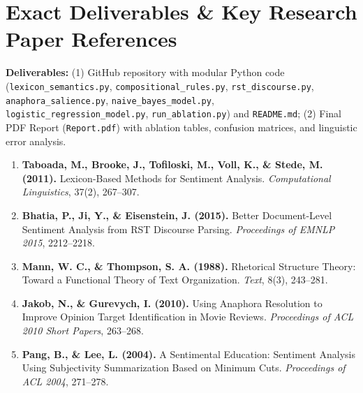 \documentclass[11pt,a4paper]{article}
\begin{document}
\section{Exact Deliverables \& Key Research Paper References}
\textbf{Deliverables:} (1) GitHub repository with modular Python code (\texttt{lexicon\_semantics.py}, \texttt{compositional\_rules.py}, \texttt{rst\_discourse.py}, \texttt{anaphora\_salience.py}, \texttt{naive\_bayes\_model.py}, \texttt{logistic\_regression\_model.py}, \texttt{run\_ablation.py}) and \texttt{README.md}; (2) Final PDF Report (\texttt{Report.pdf}) with ablation tables, confusion matrices, and linguistic error analysis.
\begin{enumerate}
    \item \textbf{Taboada, M., Brooke, J., Tofiloski, M., Voll, K., \& Stede, M. (2011).} Lexicon-Based Methods for Sentiment Analysis. \textit{Computational Linguistics}, 37(2), 267--307.
    \item \textbf{Bhatia, P., Ji, Y., \& Eisenstein, J. (2015).} Better Document-Level Sentiment Analysis from RST Discourse Parsing. \textit{Proceedings of EMNLP 2015}, 2212--2218.
    \item \textbf{Mann, W. C., \& Thompson, S. A. (1988).} Rhetorical Structure Theory: Toward a Functional Theory of Text Organization. \textit{Text}, 8(3), 243--281.
    \item \textbf{Jakob, N., \& Gurevych, I. (2010).} Using Anaphora Resolution to Improve Opinion Target Identification in Movie Reviews. \textit{Proceedings of ACL 2010 Short Papers}, 263--268.
    \item \textbf{Pang, B., \& Lee, L. (2004).} A Sentimental Education: Sentiment Analysis Using Subjectivity Summarization Based on Minimum Cuts. \textit{Proceedings of ACL 2004}, 271--278.
\end{enumerate}
\end{document}
